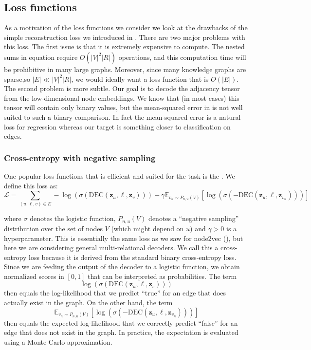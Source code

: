 \subsection{Loss functions}
As a motivation of the loss functions we consider we look at the drawbacks of the simple reconstruction loss we introduced in . There are two major problems with this loss. The first issue is that it is extremely expensive to compute. The nested sums in equation require $O(|V|^2|R|)$ operations, and this computation time will be prohibitive in many large graphs. Moreover, since many knowledge graphs are sparse,so $|E| \ll |V|^2|R|$, we would ideally want a loss function that is $O(|E|)$. The second problem is more subtle. Our goal is to decode the adjacency tensor from the low-dimensional node embeddings. We know that (in most cases) this tensor will contain only binary values, but the mean-squared error in  is not well suited to such a binary comparison. In fact the mean-squared error is a natural loss for regression whereas our target is something closer to classification on edges.

\subsubsection{Cross-entropy with negative sampling}
One popular loss functions that is efficient and suited for the task is the . We define this loss as:
\begin{equation*}
    \mathcal{L} = \sum_{(u,\ell,v)\in E} -\log(\sigma(\text{DEC}(\mathbf{z}_u, \ell, \mathbf{z}_v))) - \gamma\mathbb{E}_{v_n\sim P_{n,u}(V)}[\log(\sigma(-\text{DEC}(\mathbf{z}_u, \ell, \mathbf{z}_{v_n})))]
\end{equation*}

where $\sigma$ denotes the logistic function, $P_{n,u}(V)$ denotes a ``negative sampling'' distribution over the set of nodes $V$ (which might depend on $u$) and $\gamma > 0$ is a hyperparameter. This is essentially the same loss as we saw for node2vec (), but here we are considering general multi-relational decoders.
We call this a cross-entropy loss because it is derived from the standard binary cross-entropy loss. Since we are feeding the output of the decoder to a logistic function, we obtain normalized scores in $[0,1]$ that can be interpreted as probabilities. The term
\begin{equation}\label{eq:logLikelihood}
    \log(\sigma(\text{DEC}(\mathbf{z}_u, \ell, \mathbf{z}_v)))
\end{equation}
then equals the log-likelihood that we predict ``true'' for an edge that does actually exist in the graph. On the other hand, the term
\begin{equation}\label{eq:negativeLogLikelihood}
    \mathbb{E}_{v_n\sim P_{n,u}(V)}[\log(\sigma(-\text{DEC}(\mathbf{z}_u, \ell, \mathbf{z}_{v_n})))]
\end{equation}
then equals the expected log-likelihood that we correctly predict ``false'' for an edge that does not exist in the graph. In practice, the expectation is evaluated using a Monte Carlo approximation.

